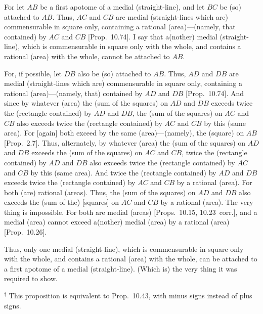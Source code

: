 \begin{Parallel}{}{}
{\epsfysize=0.26in 
\centerline{}

For let $AB$ be a first apotome of a medial (straight-line), and let $BC$ be (so) attached
to $AB$. Thus, $AC$ and $CB$ are medial (straight-lines which are)
commensurable in square only, containing a rational (area)---(namely, that
contained) by $AC$ and $CB$ [Prop.~10.74]. 
I say that a(nother) medial (straight-line), which is commensurable in square only with the whole, and
contains a rational (area) with the whole, cannot be attached to $AB$.

For, if possible, let $DB$ also be (so) attached to $AB$. Thus, $AD$ and
$DB$ are medial (straight-lines which are) commensurable in square only, containing a rational (area)---(namely, that)
contained by $AD$ and $DB$ [Prop.~10.74]. 
And since by whatever (area)
the (sum of the squares) on $AD$ and $DB$ exceeds twice the
(rectangle contained) by $AD$ and $DB$,  the (sum of the squares)
on $AC$ and $CB$ also exceeds twice the (rectangle contained) by $AC$ and
$CB$ by this (same area). For [again] both exceed by the same (area)---(namely), the (square)
on $AB$ [Prop.~2.7]. Thus, alternately, 
by whatever (area) the (sum of the squares) on $AD$ and 
$DB$ exceeds the (sum of the squares) on $AC$ and $CB$, 
 twice the (rectangle contained) by $AD$ and $DB$
also exceeds twice the (rectangle contained) by $AC$ and $CB$ by this (same area).
And twice the (rectangle contained) by $AD$ and $DB$ exceeds twice the (rectangle contained) by $AC$ and $CB$ by a rational (area). For both
(are) rational (areas). Thus,  the (sum of the squares) on $AD$ and $DB$ also
exceeds the (sum of the) [squares] on $AC$ and $CB$ by a
rational (area). The very thing is impossible. For both are
medial (areas) [Props.~10.15, 10.23~corr.],
and a medial (area) cannot exceed a(nother) medial (area) by a rational
(area) [Prop.~10.26].

Thus, only one medial (straight-line),
which is commensurable in square only with the whole, and
contains a rational (area) with the whole, can be attached
to a first apotome of a medial (straight-line). (Which is) the very thing it was required to
show.}
\end{Parallel}
{\footnotesize\noindent$^\dag$ This proposition is equivalent to 
Prop.~10.43, with minus signs instead of
plus signs.}

